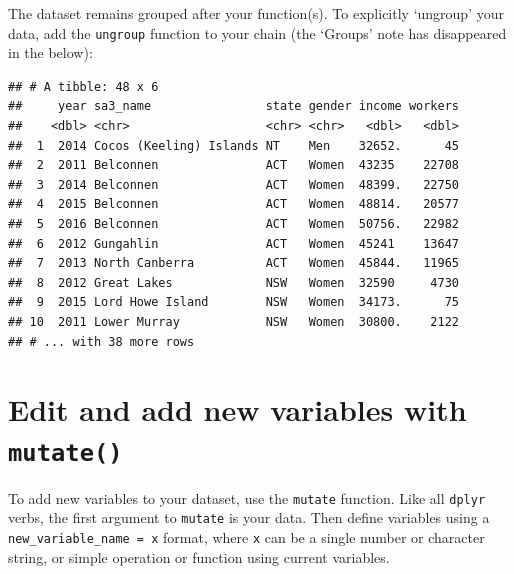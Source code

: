 \documentclass[]{book}
\newenvironment{Shaded}{\begin{snugshade}}{\end{snugshade}}
\newcommand{\KeywordTok}[1]{\textcolor[rgb]{0.13,0.29,0.53}{\textbf{#1}}}
\newcommand{\NormalTok}[1]{#1}
\newcommand{\OperatorTok}[1]{\textcolor[rgb]{0.81,0.36,0.00}{\textbf{#1}}}
\newcommand{\StringTok}[1]{\textcolor[rgb]{0.31,0.60,0.02}{#1}}
\begin{document}
The dataset remains grouped after your function(s). To explicitly `ungroup' your data, add the \texttt{ungroup} function to your chain (the `Groups' note has disappeared in the below):

\begin{Shaded}
\end{Shaded}

\begin{verbatim}
## # A tibble: 48 x 6
##     year sa3_name                state gender income workers
##    <dbl> <chr>                   <chr> <chr>   <dbl>   <dbl>
##  1  2014 Cocos (Keeling) Islands NT    Men    32652.      45
##  2  2011 Belconnen               ACT   Women  43235    22708
##  3  2014 Belconnen               ACT   Women  48399.   22750
##  4  2015 Belconnen               ACT   Women  48814.   20577
##  5  2016 Belconnen               ACT   Women  50756.   22982
##  6  2012 Gungahlin               ACT   Women  45241    13647
##  7  2013 North Canberra          ACT   Women  45844.   11965
##  8  2012 Great Lakes             NSW   Women  32590     4730
##  9  2015 Lord Howe Island        NSW   Women  34173.      75
## 10  2011 Lower Murray            NSW   Women  30800.    2122
## # ... with 38 more rows
\end{verbatim}

\hypertarget{edit-and-add-new-variables-with-mutate}{%
\section{\texorpdfstring{Edit and add new variables with \texttt{mutate()}}{Edit and add new variables with mutate()}}\label{edit-and-add-new-variables-with-mutate}}

To add new variables to your dataset, use the \texttt{mutate} function. Like all \texttt{dplyr} verbs, the first argument to \texttt{mutate} is your data. Then define variables using a \texttt{new\_variable\_name\ =\ x} format, where \texttt{x} can be a single number or character string, or simple operation or function using current variables.
\end{document}
